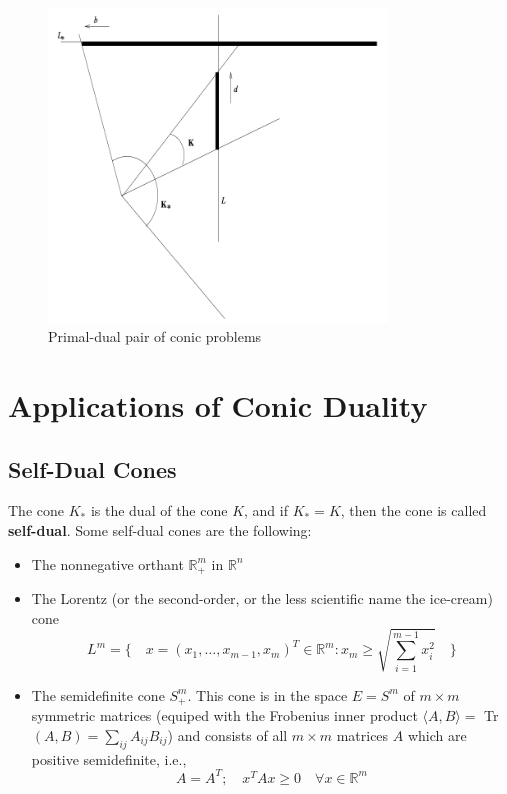 \documentclass[12pt]{article}
\newcommand{\R}{\mathbb{R}}
\begin{document}
     \begin{figure}[ht]
	\begin{center}
  		\includegraphics[width=9cm]{fig1.png}
  		\caption{Primal-dual pair of conic problems }
	  \end{center}
\end{figure}
    
    \section{Applications of Conic Duality }
    
    \subsection{Self-Dual Cones}
    The cone $K_*$ is the dual of the cone $K$, and if $K_* = K$, then the cone is called \textbf{self-dual}. Some self-dual cones are the following: 
    
    \begin{itemize}
    \item The nonnegative orthant $\R^m_{+}$ in $\R^n$
    \item The Lorentz (or the second-order, or the less scientific name the ice-cream) cone
    $$L^m =\Bigg\{ \quad  x = (x_1, \ldots, x_{m-1}, x_m)^T \in \R^m : x_m \geq \sqrt{\sum^{m-1}_{i =1}x^2_i} \quad \Bigg\}$$
    \item The semidefinite cone $S_+^m$. This cone is in the space $E = S^m$ of $m\times m$ symmetric matrices (equiped with the Frobenius inner product $\langle A, B \rangle =$ Tr$(A,B) = \sum_{ij}A_{ij}B_{ij}$) and consists of all $m \times m$ matrices $A$ which are positive semidefinite, i.e.,
    $$A = A^T; \quad x^T Ax \geq 0 \quad \forall x \in \R^m $$
    \end{itemize}
\end{document}
